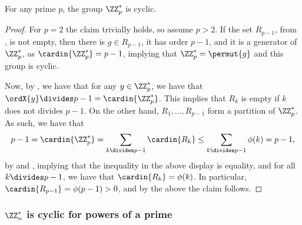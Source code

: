 \begin{lemma}
    For any prime $p$, the group $\ZZ_p^*$ is cyclic.
\end{lemma}
\begin{proof}
    For $p=2$ the claim trivially holds, so assume $p >2$.  If the set
    $R_{p-1}$, from , is not empty, then there is $g \in
    R_{p-1}$, it has order $p-1$, and it is a generator of $\ZZ_p^*$,
    as $\cardin{\ZZ_p^*} = p-1$, implying that $\ZZ_p^* = \permut{g}$
    and this group is cyclic.

    Now, by , we have that for any $y \in
    \ZZ_p^*$, we have that $\ordX{y} \divides p-1
    =\cardin{\ZZ_p^*}$. This implies that $R_k$ is empty if $k$ does
    not divides $p-1$. On the other hand, $R_1, \ldots, R_{p-1}$ form
    a partition of $\ZZ_p^*$. As such, we have that 
    \begin{align*}
        p-1 = \cardin{\ZZ_p^*}%
        =%
        \sum_{k \divides p-1} \cardin{R_k}%
        \leq%
        \sum_{k \divides p-1} \phi(k)%
        =%
        p-1,
    \end{align*}
    by  and , implying that the
    inequality in the above display is equality, and for all $k
    \divides p-1$, we have that $\cardin{R_k} = \phi(k)$. In
    particular, $\cardin{R_{p-1}} = \phi(p-1) > 0$, and by the above
    the claim follows.
\end{proof}


\subsubsection{$\ZZ_n^*$ is cyclic for powers of a prime}

